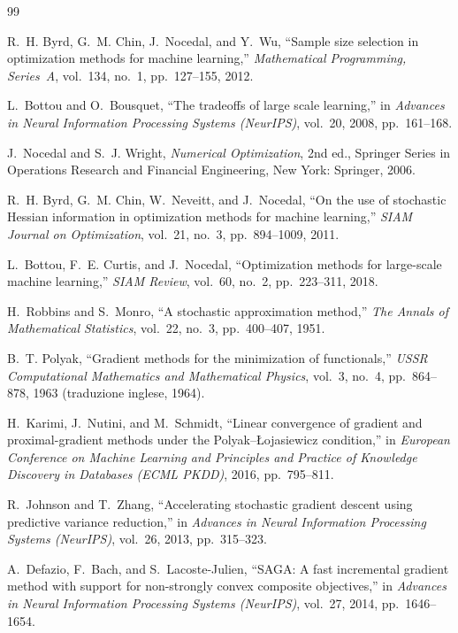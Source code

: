 \documentclass[italian, a4paper, twoside, binding=6mm]{sapthesis}
\begin{document}
\begin{thebibliography}{99}

R.~H. Byrd, G.~M. Chin, J.~Nocedal, and Y.~Wu,
``Sample size selection in optimization methods for machine learning,''
\textit{Mathematical Programming, Series~A}, vol.~134, no.~1, pp.~127--155,
2012.

L.~Bottou and O.~Bousquet,
``The tradeoffs of large scale learning,''
in \textit{Advances in Neural Information Processing Systems (NeurIPS)},
vol.~20, 2008, pp.~161--168.

J.~Nocedal and S.~J. Wright,
\textit{Numerical Optimization}, 2nd ed.,
Springer Series in Operations Research and Financial Engineering,
New York: Springer, 2006.

R.~H. Byrd, G.~M. Chin, W.~Neveitt, and J.~Nocedal,
``On the use of stochastic Hessian information in optimization methods for
machine learning,''
\textit{SIAM Journal on Optimization}, vol.~21, no.~3, pp.~894--1009, 2011.

L.~Bottou, F.~E. Curtis, and J.~Nocedal,
``Optimization methods for large-scale machine learning,''
\textit{SIAM Review}, vol.~60, no.~2, pp.~223--311, 2018.

H.~Robbins and S.~Monro,
``A stochastic approximation method,''
\textit{The Annals of Mathematical Statistics}, vol.~22, no.~3,
pp.~400--407, 1951.

B.~T. Polyak,
``Gradient methods for the minimization of functionals,''
\textit{USSR Computational Mathematics and Mathematical Physics},
vol.~3, no.~4, pp.~864--878, 1963 (traduzione inglese, 1964).

H.~Karimi, J.~Nutini, and M.~Schmidt,
``Linear convergence of gradient and proximal-gradient methods under the
Polyak--{\L}ojasiewicz condition,''
in \textit{European Conference on Machine Learning and Principles and
Practice of Knowledge Discovery in Databases (ECML PKDD)}, 2016,
pp.~795--811.

R.~Johnson and T.~Zhang,
``Accelerating stochastic gradient descent using predictive variance
reduction,''
in \textit{Advances in Neural Information Processing Systems (NeurIPS)},
vol.~26, 2013, pp.~315--323.

A.~Defazio, F.~Bach, and S.~Lacoste-Julien,
``SAGA: A fast incremental gradient method with support for non-strongly
convex composite objectives,''
in \textit{Advances in Neural Information Processing Systems (NeurIPS)},
vol.~27, 2014, pp.~1646--1654.


\end{thebibliography}
\end{document}
